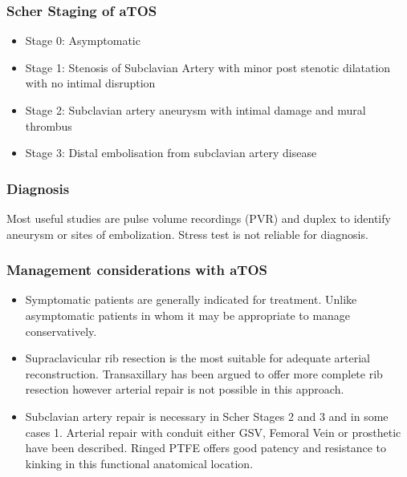 \documentclass[
]{book}
\begin{document}
\hypertarget{scher-staging-of-atos}{%
\subsubsection{Scher Staging of aTOS}\label{scher-staging-of-atos}}

\begin{itemize}
\item
  Stage 0: Asymptomatic
\item
  Stage 1: Stenosis of Subclavian Artery with minor post stenotic
  dilatation with no intimal disruption
\item
  Stage 2: Subclavian artery aneurysm with intimal damage and mural
  thrombus
\item
  Stage 3: Distal embolisation from subclavian artery disease
\end{itemize}

\hypertarget{diagnosis}{%
\subsubsection{Diagnosis}\label{diagnosis}}

Most useful studies are pulse volume recordings (PVR) and duplex to
identify aneurysm or sites of embolization. Stress test is not reliable
for diagnosis. \citep{vemuriClinicalPresentationManagement2017, criadoSpectrumArterialCompression2010}

\hypertarget{management-considerations-with-atos}{%
\subsubsection{Management considerations with aTOS}\label{management-considerations-with-atos}}

\begin{itemize}
\item
  Symptomatic patients are generally indicated for treatment. Unlike
  asymptomatic patients in whom it may be appropriate to manage
  conservatively. \citep{boll122ThoracicOutlet2019}
\item
  Supraclavicular rib resection is the most suitable for adequate
  arterial reconstruction. Transaxillary has been argued to offer more
  complete rib resection however arterial repair is not possible in
  this approach.
\item
  Subclavian artery repair is necessary in Scher Stages 2 and 3 and in
  some cases 1. Arterial repair with conduit either GSV, Femoral Vein
  or prosthetic have been described. Ringed PTFE offers good patency
  and resistance to kinking in this functional anatomical location.~
\end{itemize}
\end{document}
